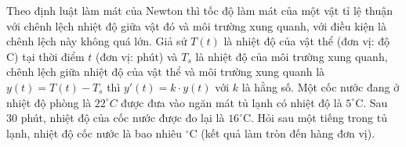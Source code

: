 \begin{bt}%
	Theo định luật làm mát của Newton thì tốc độ làm mát của một vật tỉ lệ thuận với chênh lệch nhiệt độ giữa vật đó và môi trường xung quanh, với điều kiện là chênh lệch này không quá lớn. Giả sử $T(t)$ là nhiệt độ của vật thể (đơn vị: độ C) tại thời điểm $t$ (đơn vị: phút) và $T_s$ là nhiệt độ của môi trường xung quanh, chênh lệch giữa nhiệt độ của vật thể và môi trường xung quanh là $y(t)=T(t)-T_s$ thì $y'(t)=k \cdot y(t)$ với $k$ là hằng số. Một cốc nước đang ở nhiệt độ phòng là $22^{\circ} C$ được đưa vào ngăn mát tủ lạnh có nhiệt độ là $5^{\circ}$C. Sau $30$ phút, nhiệt độ của cốc nước được đo lại là $16^{\circ}$C.  Hỏi sau một tiếng trong tủ lạnh, nhiệt độ cốc nước là bao nhiêu $^\circ$C (kết quả làm tròn đến hàng đơn vị).
\end{bt}

